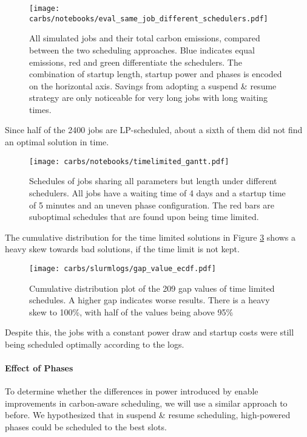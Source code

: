 \begin{figure}[H]
    \texttt{[image: carbs/notebooks/eval\_same\_job\_different\_schedulers.pdf]}
    \caption[short]{All simulated jobs and their total carbon emissions, compared between the two scheduling approaches. Blue indicates equal emissions, red and green differentiate the schedulers. The combination of startup length, startup power and phases is encoded on the horizontal axis. Savings from adopting a suspend \& resume strategy are only noticeable for very long jobs with long waiting times.}
    \label{fig:eval_different_schedulers}
\end{figure}

Since half of the 2400 jobs are LP-scheduled, about a sixth of them did not find an optimal solution in time.

\begin{figure}[H]
    \texttt{[image: carbs/notebooks/timelimited\_gantt.pdf]}
    \caption[short]{Schedules of jobs sharing all parameters but length under different schedulers. All jobs have a waiting time of 4 days and a startup time of 5 minutes and an uneven phase configuration. The red bars are suboptimal schedules that are found upon being time limited.}
    \label{fig:timelimited_gantt}
\end{figure}

The cumulative distribution for the time limited solutions in Figure \ref{fig:ecdf_gap} shows a heavy skew towards bad solutions, if the time limit is not kept.

\begin{figure}[H]
    \texttt{[image: carbs/slurmlogs/gap\_value\_ecdf.pdf]}
    \caption[short]{Cumulative distribution plot of the 209 gap values of time limited schedules. A higher gap indicates worse results. There is a heavy skew to 100\%, with half of the values being above 95\%}
    \label{fig:ecdf_gap}
\end{figure}

Despite this, the jobs with a constant power draw and startup costs were still being scheduled optimally according to the logs. 

\paragraph{Effect of Phases}

To determine whether the differences in power introduced by \modelname{} enable improvements in carbon-aware scheduling, we will use a similar approach to before. We hypothesized that in suspend \& resume scheduling, high-powered phases could be scheduled to the best slots.

